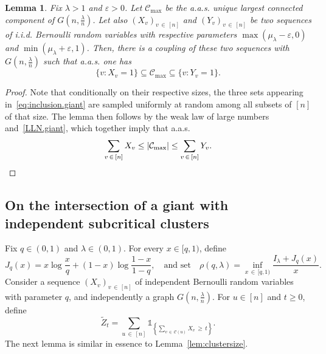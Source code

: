 \documentclass[10pt]{amsart}
\newtheorem{lemm}[theo]{Lemma}\newtheorem{prop}[theo]{Proposition}\newtheorem{coro}[theo]{Corollary}\newtheorem{conj}[theo]{Conjecture}
\theoremstyle{definition}\newtheorem{defi}[theo]{Definition}\newtheorem{rema}[theo]{Remark}\newtheorem{exam}[theo]{Example}\newtheorem{exem}[theo]{Example}\newtheorem{nota}[theo]{Notation}
\newcommand{\cC}{\mathcal{C}}
\begin{document}
\begin{lemm}\label{lem:stoch.giant}
Fix $\lambda>1$ and $\varepsilon>0$. Let $\cC_{\max}$ be the a.a.s. unique largest connected component of $G(n,\frac \lambda n)$. Let also $(X_v)_{v\,\in\,[n]}$ and $(Y_v)_{v\,\in\,[n]}$ be two sequences of i.i.d. Bernoulli random variables with respective parameters $\max(\mu_\lambda-\varepsilon,0)$ and $\min(\mu_\lambda+\varepsilon,1)$. Then, there is a coupling of these two sequences with $G(n,\tfrac{\lambda}n)$ such that a.a.s. one has
\begin{equation}\label{eq:inclusion.giant}
\{v : X_v=1\} \subseteq \cC_{\max} \subseteq \{v : Y_v=1\}.
\end{equation}
\end{lemm}

\begin{proof}
Note that conditionally on their respective sizes, the three sets appearing in~\eqref{eq:inclusion.giant} are sampled uniformly at random among all subsets of $[n]$ of that size. The lemma then follows by the weak law of large numbers and~\eqref{LLN.giant}, which together imply that a.a.s.\
\[
\sum_{v\,\in\,[n]} X_v\le |\cC_{\max}|\le \sum_{v\,\in\,[n]} Y_v.\qedhere
\]
\end{proof}

\subsection{On the intersection of a giant with independent subcritical clusters}\label{sec.prel.intersection}
Fix $q\in (0,1)$ and $\lambda \in (0,1)$. For every $x\in [q,1)$, define
\[
J_q(x)= x\log \frac xq + (1-x)\log \frac{1-x}{1-q},\quad \text{and set}\quad \rho(q,\lambda) = \inf_{x\,\in\,[q,1)} \frac {I_\lambda+J_q(x)}{x}.
\]
Consider a sequence $(X_v)_{v\,\in\,[n]}$ of independent Bernoulli random variables with parameter $q$, and independently a graph $G(n,\tfrac {\lambda} n)$. For $u\in [n]$ and $t\ge 0$, define
\[
\widetilde Z_t = \sum_{u\,\in\,[n]} \mathds{1}_{\left\{\sum_{v\,\in\,\cC(u)} X_v\, \ge\, t\right\}}.
\]
The next lemma is similar in essence to Lemma~\ref{lem:clustersize}.
\end{document}
